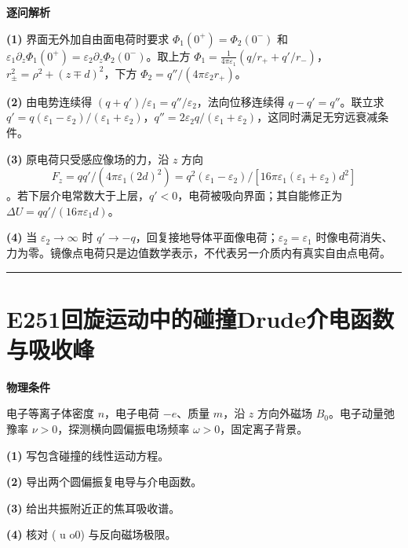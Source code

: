 \documentclass[UTF8,a4paper,11pt,oneside,openany]{ctexbook}
\begin{document}
\par\medskip\noindent\textbf{逐问解析}
\par\noindent\textbf{(1)} 界面无外加自由面电荷时要求 \(\Phi_1(0^+)=\Phi_2(0^-)\) 和 \(\varepsilon_1\partial_z\Phi_1(0^+)=\varepsilon_2\partial_z\Phi_2(0^-)\)。取上方 \(\Phi_1=\frac{1}{4\pi\varepsilon_1}(q/r_++q'/r_-)\)，\(r_\pm^2=\rho^2+(z\mp d)^2\)，下方 \(\Phi_2=q''/(4\pi\varepsilon_2r_+)\)。
\par\noindent\textbf{(2)} 由电势连续得 \((q+q')/\varepsilon_1=q''/\varepsilon_2\)，法向位移连续得 \(q-q'=q''\)。联立求 \(q'=q(\varepsilon_1-\varepsilon_2)/(\varepsilon_1+\varepsilon_2)\)，\(q''=2\varepsilon_2q/(\varepsilon_1+\varepsilon_2)\)，这同时满足无穷远衰减条件。
\par\noindent\textbf{(3)} 原电荷只受感应像场的力，沿 \(z\) 方向 \[F_z=qq'/(4\pi\varepsilon_1(2d)^2)=q^2(\varepsilon_1-\varepsilon_2)/[16\pi\varepsilon_1(\varepsilon_1+\varepsilon_2)d^2]\]。若下层介电常数大于上层，\(q'<0\)，电荷被吸向界面；其自能修正为 \(\Delta U=qq'/(16\pi\varepsilon_1d)\)。
\par\noindent\textbf{(4)} 当 \(\varepsilon_2\to\infty\) 时 \(q'\to-q\)，回复接地导体平面像电荷；\(\varepsilon_2=\varepsilon_1\) 时像电荷消失、力为零。镜像点电荷只是边值数学表示，不代表另一介质内有真实自由点电荷。

\par\bigskip\hrule\bigskip
\section*{E251\quad 回旋运动中的碰撞Drude介电函数与吸收峰}
\textbf{物理条件}\par 电子等离子体密度 \(n\)，电子电荷 \(-e\)、质量 \(m\)，沿 \(z\) 方向外磁场 \(B_0\)。电子动量弛豫率 \(\nu>0\)，探测横向圆偏振电场频率 \(\omega>0\)，固定离子背景。
\par\noindent\textbf{(1)} 写包含碰撞的线性运动方程。
\par\noindent\textbf{(2)} 导出两个圆偏振复电导与介电函数。
\par\noindent\textbf{(3)} 给出共振附近正的焦耳吸收谱。
\par\noindent\textbf{(4)} 核对 (
u	o0) 与反向磁场极限。
\end{document}
